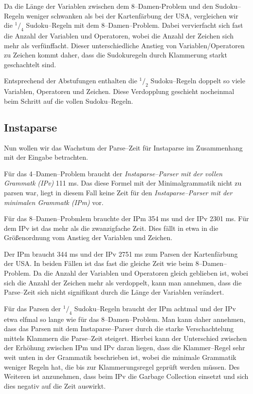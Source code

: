 \documentclass[ngerman,a4paper,abstracton,open=right,twoside=false,toc=listofnumbered,bibtotocnumbered]{scrreprt}
\begin{document}
Da die Länge der Variablen zwischen dem 8--Damen-Problem und den Sudoku--Regeln weniger schwanken als bei der Kartenfärbung der USA, vergleichen wir die $^1/_4$ Sudoku--Regeln mit dem 8--Damen--Problem. Dabei vervierfacht sich fast die Anzahl der Variablen und Operatoren, wobei die Anzahl der Zeichen sich mehr als verfünffacht. Dieser unterschiedliche Anstieg von Variablen/Operatoren zu Zeichen kommt daher, dass die Sudokuregeln durch Klammerung starkt geschachtelt sind.

Entsprechend der Abstufungen enthalten die $^1/_2$ Sudoku--Regeln doppelt so viele Variablen, Operatoren und Zeichen. Diese Verdopplung geschieht nocheinmal beim Schritt auf die vollen Sudoku--Regeln.

\subsection{Instaparse}

Nun wollen wir das Wachstum der Parse--Zeit für Instaparse im Zusammenhang mit der Eingabe betrachten.

Für das 4--Damen--Problem braucht der \emph{Instaparse--Parser mit der vollen Grammatk (IPv)} 111 ms. Das diese Formel mit der Minimalgrammatik nicht zu parsen war, liegt in diesem Fall keine Zeit für den \emph{Instaparse--Parser mit der minimalen Grammatk (IPm)} vor.

Für das 8--Damen--Probmlem brauchte der IPm 354 ms und der IPv 2301 ms. Für dem IPv ist das mehr als die zwanzigfache Zeit. Dies fällt in etwa in die Größenordnung vom Anstieg der Variablen und Zeichen.

Der IPm braucht 344 ms und der IPv 2751 ms zum Parsen der Kartenfärbung der USA. In beiden Fällen ist das fast die gleiche Zeit wie beim 8--Damen--Problem. Da die Anzahl der Variablen und Operatoren gleich geblieben ist, wobei sich die Anzahl der Zeichen mehr als verdoppelt, kann man annehmen, dass die Parse--Zeit sich nicht signifikant durch die Länge der Variablen verändert.

Für das Parsen der $^1/_4$ Sudoku--Regeln braucht der IPm achtmal und der IPv etwa elfmal so lange wie für das 8--Damen--Problem. Man kann daher annehmen, dass das Parsen mit dem Instaparse--Parser durch die starke Verschachtelung mittels Klammern die Parse--Zeit steigert. Hierbei kann der Unterschied zwischen der Erhöhung zwischen IPm und IPv daran liegen, dass die Klammer--Regel sehr weit unten in der Grammatik beschrieben ist, wobei die minimale Grammatik weniger Regeln hat, die bis zur Klammerungsregel geprüft werden müssen. Des Weiteren ist anzunehmen, dass beim IPv die Garbage Collection einsetzt und sich dies negativ auf die Zeit auswirkt.
\end{document}
